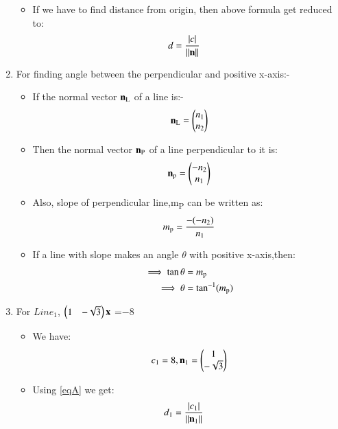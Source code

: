 \documentclass[journal,12pt,twocolumn]{IEEEtran}
\begin{document}
\begin{enumerate}
\begin{itemize}
\item If we have to find distance from origin, then above formula get reduced to:
\begin{align}
d&=\frac { \left| c \right| }{\norm{\vec{n}}}\label{eqA}
\end{align}
\end{itemize}
\item For finding angle between the perpendicular and positive x-axis:-
\begin{itemize}
 \item If the normal vector $\vec{n\textsubscript{L}}$ of a line is:-
    \begin{align}
   \vec{n\textsubscript{L}}=\myvec{n\textsubscript{1}\\n\textsubscript{2}}     
    \end{align}
\item Then the normal vector $\vec{n\textsubscript{P}}$ of a line perpendicular to it is:
\begin{align}
   \vec{n\textsubscript{p}}=\myvec{-n\textsubscript{2}\\n\textsubscript{1}}    \label{eqa} 
    \end{align}
\item Also, slope of perpendicular line,m\textsubscript{P} can be written as:
\begin{align}
 m\textsubscript{p}=\frac{-(-n\textsubscript{2})}{n\textsubscript{1}}  \label{eqb}
 \end{align}
\item If a line with slope  makes an angle $\theta$ with positive x-axis,then:
\begin{align}
\implies\tan\theta&= m\textsubscript{p}
  \\
 \implies \theta &= \tan^{-1}( m\textsubscript{p})\label{eqD}
\end{align}
\end{itemize}
\item For $Line_1$, $\myvec{1&-\sqrt{3}}\vec{x}$ =$-8$
\begin{itemize}
\item We have:
\begin{align}
 c\textsubscript{1}=8 , {\vec{n\textsubscript{1}}}=\myvec{1\\-\sqrt{3}}   
\end{align}
\item Using \eqref{eqA} we get:
\begin{align}
d\textsubscript{1}&=\frac { \left| c\textsubscript{1} \right| }{\norm{\vec{n\textsubscript{1}}}}

\end{align}
\end{itemize}
\end{enumerate}
\end{document}
